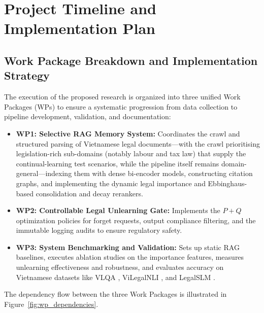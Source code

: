 \section{Project Timeline and Implementation Plan}

\subsection{Work Package Breakdown and Implementation Strategy}
The execution of the proposed research is organized into three unified Work Packages (WPs) to ensure a systematic progression from data collection to pipeline development, validation, and documentation:
\begin{itemize}
    \item \textbf{WP1: Selective RAG Memory System:} Coordinates the crawl and structured parsing of Vietnamese legal documents---with the crawl prioritising legislation-rich sub-domains (notably labour and tax law) that supply the continual-learning test scenarios, while the pipeline itself remains domain-general---indexing them with dense bi-encoder models, constructing citation graphs, and implementing the dynamic legal importance and Ebbinghaus-based consolidation and decay rerankers.
    \item \textbf{WP2: Controllable Legal Unlearning Gate:} Implements the $P+Q$ optimization policies for forget requests, output compliance filtering, and the immutable logging audits to ensure regulatory safety.
    \item \textbf{WP3: System Benchmarking and Validation:} Sets up static RAG baselines, executes ablation studies on the importance features, measures unlearning effectiveness and robustness, and evaluates accuracy on Vietnamese datasets like VLQA \parencite{nguyen2025vlqacomprehensivelargehighquality}, ViLegalNLI \parencite{duong2026vilegalnlinaturallanguageinference}, and LegalSLM \parencite{le-etal-2025-overview}.
\end{itemize}

The dependency flow between the three Work Packages is illustrated in Figure~\ref{fig:wp_dependencies}.


